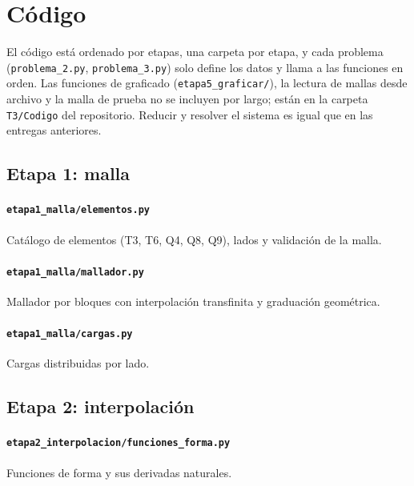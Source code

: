 \newpage
\section*{C\'odigo}

El c\'odigo est\'a ordenado por etapas, una carpeta por etapa, y cada problema
(\texttt{problema\_2.py}, \texttt{problema\_3.py}) solo define los datos y llama
a las funciones en orden. Las funciones de graficado
(\texttt{etapa5\_graficar/}), la lectura de mallas desde archivo y la malla de
prueba no se incluyen por largo; est\'an en la carpeta \texttt{T3/Codigo} del
repositorio. Reducir y resolver el sistema es igual que en las entregas
anteriores.

\subsection*{Etapa 1: malla}

\paragraph{\texttt{etapa1\_malla/elementos.py}} Cat\'alogo de elementos (T3, T6, Q4, Q8, Q9), lados y validaci\'on de la malla.


\paragraph{\texttt{etapa1\_malla/mallador.py}} Mallador por bloques con interpolaci\'on transfinita y graduaci\'on geom\'etrica.


\paragraph{\texttt{etapa1\_malla/cargas.py}} Cargas distribuidas por lado.


\subsection*{Etapa 2: interpolaci\'on}

\paragraph{\texttt{etapa2\_interpolacion/funciones\_forma.py}} Funciones de forma y sus derivadas naturales.


